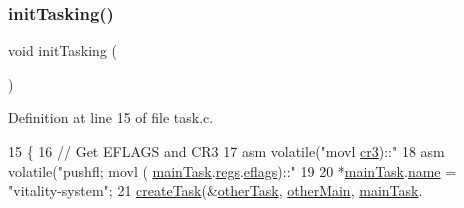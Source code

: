 \mbox{\label{a00044_aea945e91746a54801f4763ad264746b9_aea945e91746a54801f4763ad264746b9}} 
\subsubsection{\texorpdfstring{init\+Tasking()}{initTasking()}}
{\footnotesize\ttfamily void init\+Tasking (\begin{DoxyParamCaption}{ }\end{DoxyParamCaption})}



Definition at line 15 of file task.\+c.


\begin{DoxyCode}
15                    \{
16     \textcolor{comment}{// Get EFLAGS and CR3}
17     \textcolor{keyword}{asm} \textcolor{keyword}{volatile}(\textcolor{stringliteral}{"movl %
      \hyperlink{a00130_ab818d6f237e6d73d321339e6fcd66abf_ab818d6f237e6d73d321339e6fcd66abf}{cr3})::\textcolor{stringliteral}{"%
18     \textcolor{keyword}{asm} \textcolor{keyword}{volatile}(\textcolor{stringliteral}{"pushfl; movl (%
      \hyperlink{a00044_a228ac88416ebaa8713846e3e5e3e9b6d_a228ac88416ebaa8713846e3e5e3e9b6d}{mainTask}.\hyperlink{a00134_a136b243ee52ff89e9ba97f4e4dba19bb_a136b243ee52ff89e9ba97f4e4dba19bb}{regs}.\hyperlink{a00130_a5216970c0d34ab4b53881f583839c8f9_a5216970c0d34ab4b53881f583839c8f9}{eflags})::\textcolor{stringliteral}{"%
19  
20     *\hyperlink{a00044_a228ac88416ebaa8713846e3e5e3e9b6d_a228ac88416ebaa8713846e3e5e3e9b6d}{mainTask}.\hyperlink{a00134_a7718ab6bb7a99b2b818b5b5cf9176456_a7718ab6bb7a99b2b818b5b5cf9176456}{name} = \textcolor{stringliteral}{"vitality-system"};
21     \hyperlink{a00044_ad60a944f16bf46088320833cf2464e1e_ad60a944f16bf46088320833cf2464e1e}{createTask}(&\hyperlink{a00044_ab0e87ab98b8b029839a398838d16e1f0_ab0e87ab98b8b029839a398838d16e1f0}{otherTask}, \hyperlink{a00044_a4337f8ca98d2a8f8e09bf6e26b4e8bb0_a4337f8ca98d2a8f8e09bf6e26b4e8bb0}{otherMain}, \hyperlink{a00044_a228ac88416ebaa8713846e3e5e3e9b6d_a228ac88416ebaa8713846e3e5e3e9b6d}{mainTask}.
}}}}
\end{DoxyCode}
